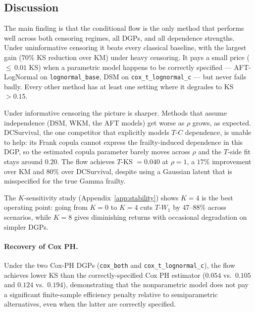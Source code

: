 \subsection{Discussion}
\label{sec:sim-discussion}

The main finding is that the conditional flow is the only method that
performs well across both censoring regimes, all DGPs, and all
dependence strengths. Under uninformative censoring it beats every
classical baseline, with the largest gain ($70\%$ KS reduction over KM)
under heavy censoring. It pays a small price (${\leq}\,0.01$ KS) when a
parametric model happens to be correctly specified --- AFT-LogNormal on
\texttt{lognormal\_base}, DSM on \texttt{cox\_t\_lognormal\_c} --- but
never fails badly. Every other method has at least one setting where it
degrades to KS $> 0.15$.

Under informative censoring the picture is sharper. Methods that assume
independence (DSM, WKM, the AFT models) get worse as $\rho$ grows, as
expected. DCSurvival, the one competitor that explicitly models
$T$-$C$ dependence, is unable to help: its Frank copula cannot express
the frailty-induced dependence in this DGP, so the estimated copula
parameter barely moves across $\rho$ and the $T$-side fit stays around
$0.20$. The flow achieves $T$-KS $= 0.040$ at $\rho = 1$, a $17\%$
improvement over KM and $80\%$ over DCSurvival, despite using a
Gaussian latent that is misspecified for the true Gamma frailty.

The $K$-sensitivity study (Appendix~\ref{app:stability}) shows $K{=}4$
is the best operating point: going from $K{=}0$ to $K{=}4$ cuts
$T$-$W_1$ by $47$--$88\%$ across scenarios, while $K{=}8$ gives
diminishing returns with occasional degradation on simpler DGPs.

\paragraph{Recovery of Cox PH.}
Under the two Cox-PH DGPs (\texttt{cox\_both} and
\texttt{cox\_t\_lognormal\_c}), the flow achieves lower KS than the
correctly-specified Cox PH estimator ($0.054$ vs.\ $0.105$ and $0.124$
vs.\ $0.194$), demonstrating that the nonparametric model does not pay a
significant finite-sample efficiency penalty relative to semiparametric
alternatives, even when the latter are correctly specified.

